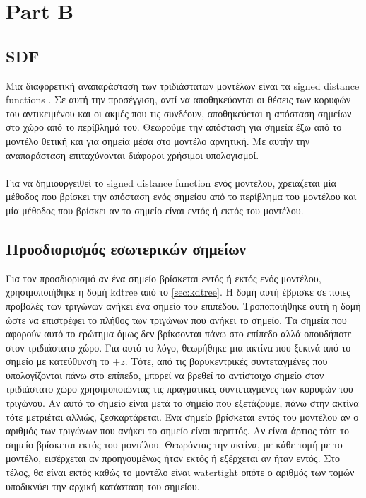 \documentclass{report}
\begin{document}
\chapter{Part B}


\section{SDF}
Μια διαφορετική αναπαράσταση των τριδιάστατων μοντέλων είναι τα signed distance functions \cite{signed-distance-function}.
Σε αυτή την προσέγγιση, αντί να αποθηκεύονται οι θέσεις των κορυφών του αντικειμένου και οι ακμές που τις συνδέουν, 
αποθηκεύεται η απόσταση σημείων στο χώρο από το περίβλημά του. Θεωρούμε την απόσταση για σημεία έξω από το μοντέλο θετική
και για σημεία μέσα στο μοντέλο αρνητική. Με αυτήν την αναπαράσταση επιταχύνονται διάφοροι χρήσιμοι υπολογισμοί.
\\\\
Για να δημιουργειθεί το signed distance function ενός μοντέλου, χρειάζεται μία μέθοδος που βρίσκει την απόσταση
ενός σημείου από το περίβλημα του μοντέλου και μία μέθοδος που βρίσκει αν το σημείο είναι εντός ή εκτός του μοντέλου.


\section{Προσδιορισμός εσωτερικών σημείων}
Για τον προσδιορισμό αν ένα σημείο βρίσκεται εντός ή εκτός ενός μοντέλου, χρησιμοποιήθηκε η δομή kdtree από το \ref{sec:kdtree}.
Η δομή αυτή έβρισκε σε ποιες προβολές των τριγώνων ανήκει ένα σημείο του επιπέδου. Τροποποιήθηκε αυτή η δομή
ώστε να επιστρέφει το πλήθος των τριγώνων που ανήκει το σημείο. Τα σημεία που αφορούν αυτό το ερώτημα όμως δεν βρίκσονται πάνω
στο επίπεδο αλλά οπουδήποτε στον τριδιάστατο χώρο. Για αυτό το λόγο, θεωρήθηκε μια ακτίνα που ξεκινά από το σημείο με
κατεύθυνση το $+z$. Τότε, από τις βαρυκεντρικές συντεταγμένες που υπολογίζονται πάνω στο επίπεδο, μπορεί να βρεθεί το
αντίστοιχο σημείο στον τριδιάστατο χώρο χρησιμοποιώντας τις πραγματικές συντεταγμένες των κορυφών του τριγώνου.
Αν αυτό το σημείο είναι μετά το σημείο που εξετάζουμε, πάνω στην ακτίνα τότε μετριέται αλλιώς, ξεσκαρτάρεται.
Ένα σημείο βρίσκεται εντός του μοντέλου αν ο αριθμός των τριγώνων που ανήκει το σημείο είναι περιττός. Αν είναι άρτιος
τότε το σημείο βρίσκεται εκτός του μοντέλου. Θεωρόντας την ακτίνα, με κάθε τομή με το μοντέλο, εισέρχεται αν προηγουμένως
ήταν εκτός ή εξέρχεται αν ήταν εντός. Στο τέλος, θα είναι εκτός καθώς το μοντέλο είναι watertight οπότε ο αριθμός των τομών
υποδικνύει την αρχική κατάσταση του σημείου.
\end{document}
